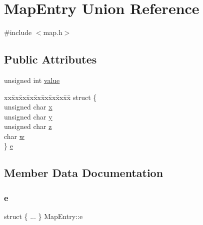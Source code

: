 \hypertarget{unionMapEntry}{}\section{Map\+Entry Union Reference}
\label{unionMapEntry}


{\ttfamily \#include $<$map.\+h$>$}

\subsection*{Public Attributes}
\begin{DoxyCompactItemize}
\item 
unsigned int \hyperlink{unionMapEntry_a5dd4efdec12b49b1f2fe58aad41e8f50}{value}
\item 
\begin{tabbing}
xx\=xx\=xx\=xx\=xx\=xx\=xx\=xx\=xx\=\kill
struct \{\\
\>unsigned char \hyperlink{unionMapEntry_a2ce48990b14ea63b8b166c044a845902}{x}\\
\>unsigned char \hyperlink{unionMapEntry_a3cb395be05afd1381c3f5d862a2218d3}{y}\\
\>unsigned char \hyperlink{unionMapEntry_aeebe1190e2585cd8bbdd32b3faf590cd}{z}\\
\>char \hyperlink{unionMapEntry_a95795e5a3f7c18129e5839d26b8b7167}{w}\\
\} \hyperlink{unionMapEntry_a278b4a881f536989cf29ee53535b7f98}{e}\\

\end{tabbing}\end{DoxyCompactItemize}


\subsection{Member Data Documentation}
\mbox{\label{unionMapEntry_a278b4a881f536989cf29ee53535b7f98}} 
\subsubsection{\texorpdfstring{e}{e}}
{\footnotesize\ttfamily struct \{ ... \}   Map\+Entry\+::e}

\mbox{\label{unionMapEntry_a5dd4efdec12b49b1f2fe58aad41e8f50}} 
